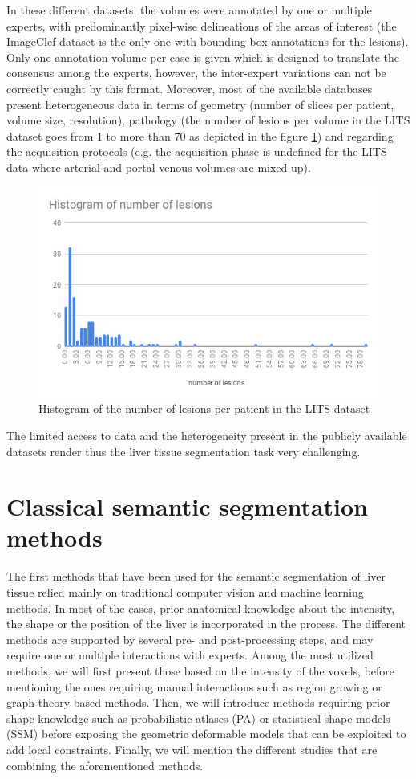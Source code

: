 \documentclass[]{article}
\begin{document}
	In these different datasets, the volumes were annotated by one or
	multiple experts, with predominantly pixel-wise delineations of the
	areas of interest (the ImageClef dataset is the only one with bounding
	box annotations for the lesions). Only one annotation volume per case is
	given which is designed to translate the consensus among the experts,
	however, the inter-expert variations can not be correctly caught by this
	format. Moreover, most of the available databases present heterogeneous
	data in terms of geometry (number of slices per patient, volume size,
	resolution), pathology (the number of lesions per volume in the LITS
	dataset goes from 1 to more than 70 as depicted in the figure \ref{NumberOfLesionsLits}) and regarding the
	acquisition protocols (e.g. the acquisition phase is undefined for the
	LITS data where arterial and portal venous volumes are mixed up).\\
	
	\begin{figure}[!ht]
		\centering
		\includegraphics[width=0.5\linewidth]{images/image11}
		\caption{Histogram of the number of lesions per patient in the LITS dataset}
		\label{NumberOfLesionsLits}
	\end{figure}
	The limited access to data and the heterogeneity present in the publicly
	available datasets render thus the liver tissue segmentation task very
	challenging.
	
	\section*{Classical semantic segmentation methods}
	
	The first methods that have been used for the semantic segmentation of
	liver tissue relied mainly on traditional computer vision and machine
	learning methods. In most of the cases, prior anatomical knowledge about
	the intensity, the shape or the position of the liver is incorporated in
	the process. The different methods are supported by several pre- and
	post-processing steps, and may require one or multiple interactions with
	experts.
	Among the most utilized methods, we will first present those based on
	the intensity of the voxels, before mentioning the ones requiring manual
	interactions such as region growing or graph-theory based methods. Then,
	we will introduce methods requiring prior shape knowledge such as
	probabilistic atlases (PA) or statistical shape models (SSM) before
	exposing the geometric deformable models that can be exploited to add
	local constraints.
	Finally, we will mention the different studies that are combining the
	aforementioned methods.
	
\end{document}

